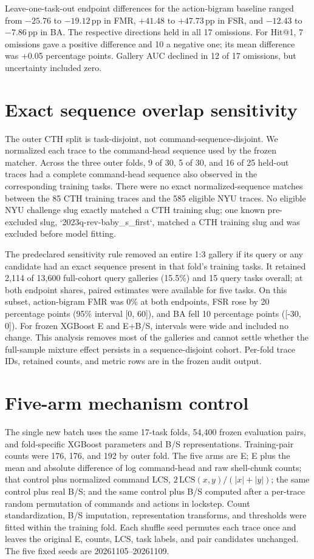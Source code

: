 \documentclass[10pt]{article}
\newcommand{\pp}{\ensuremath{\,\mathrm{pp}}}
\begin{document}
Leave-one-task-out endpoint differences for the action-bigram baseline ranged from $-25.76$ to $-19.12\pp$ in FMR, $+41.48$ to $+47.73\pp$ in FSR, and $-12.43$ to $-7.86\pp$ in BA. The respective directions held in all 17 omissions. For Hit@1, 7 omissions gave a positive difference and 10 a negative one; its mean difference was +0.05 percentage points. Gallery AUC declined in 12 of 17 omissions, but uncertainty included zero.

\section{Exact sequence overlap sensitivity}
The outer CTH split is task-disjoint, not command-sequence-disjoint. We normalized each trace to the command-head sequence used by the frozen matcher. Across the three outer folds, 9 of 30, 5 of 30, and 16 of 25 held-out traces had a complete command-head sequence also observed in the corresponding training tasks. There were no exact normalized-sequence matches between the 85 CTH training traces and the 585 eligible NYU traces. No eligible NYU challenge slug exactly matched a CTH training slug; one known pre-excluded slug, `2023q-rev-baby\_s\_first`, matched a CTH training slug and was excluded before model fitting.

The predeclared sensitivity rule removed an entire 1:3 gallery if its query or any candidate had an exact sequence present in that fold's training tasks. It retained 2,114 of 13,600 full-cohort query galleries (15.5\%) and 15 query tasks overall; at both endpoint shares, paired estimates were available for five tasks. On this subset, action-bigram FMR was 0\% at both endpoints, FSR rose by 20 percentage points (95\% interval [0, 60]), and BA fell 10 percentage points ([-30, 0]). For frozen XGBoost E and E+B/S, intervals were wide and included no change. This analysis removes most of the galleries and cannot settle whether the full-sample mixture effect persists in a sequence-disjoint cohort. Per-fold trace IDs, retained counts, and metric rows are in the frozen audit output.

\section{Five-arm mechanism control}
The single new batch uses the same 17-task folds, 54,400 frozen evaluation pairs, and fold-specific XGBoost parameters and B/S representations. Training-pair counts were 176, 176, and 192 by outer fold. The five arms are E; E plus the mean and absolute difference of log command-head and raw shell-chunk counts; that control plus normalized command LCS, $2\,\mathrm{LCS}(x,y)/(|x|+|y|)$; the same control plus real B/S; and the same control plus B/S computed after a per-trace random permutation of commands and actions in lockstep. Count standardization, B/S imputation, representation transforms, and thresholds were fitted within the training fold. Each shuffle seed permutes each trace once and leaves the original E, counts, LCS, task labels, and pair candidates unchanged. The five fixed seeds are 20261105--20261109.
\end{document}

